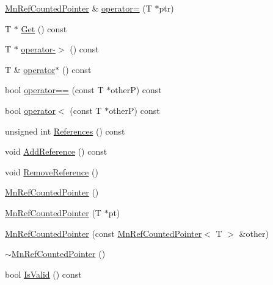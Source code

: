 \begin{DoxyCompactItemize}
\item 
\mbox{\hyperlink{classROOT_1_1Minuit2_1_1MnRefCountedPointer}{Mn\+Ref\+Counted\+Pointer}} \& \mbox{\hyperlink{classROOT_1_1Minuit2_1_1MnRefCountedPointer_a6867125c7f9d76199e7a6676eed5f682}{operator=}} (T $\ast$ptr)
\item 
T $\ast$ \mbox{\hyperlink{classROOT_1_1Minuit2_1_1MnRefCountedPointer_ae88bd272c286587bad6200c41c66909b}{Get}} () const
\item 
T $\ast$ \mbox{\hyperlink{classROOT_1_1Minuit2_1_1MnRefCountedPointer_a9fa09cb52e1c503eb82c3359932eef34}{operator-\/$>$}} () const
\item 
T \& \mbox{\hyperlink{classROOT_1_1Minuit2_1_1MnRefCountedPointer_ab926bb95d092c87afef79bb6c1776bd4}{operator$\ast$}} () const
\item 
bool \mbox{\hyperlink{classROOT_1_1Minuit2_1_1MnRefCountedPointer_a2dbec0c22ef3492abc24cdaa885fd26e}{operator==}} (const T $\ast$otherP) const
\item 
bool \mbox{\hyperlink{classROOT_1_1Minuit2_1_1MnRefCountedPointer_a5927f1f650da34bb024a31e18119ed1e}{operator$<$}} (const T $\ast$otherP) const
\item 
unsigned int \mbox{\hyperlink{classROOT_1_1Minuit2_1_1MnRefCountedPointer_acffac58848d817d7747631954daf3e0c}{References}} () const
\item 
void \mbox{\hyperlink{classROOT_1_1Minuit2_1_1MnRefCountedPointer_a9a8d01a9009e9a9b272c14e46cbeb4d5}{Add\+Reference}} () const
\item 
void \mbox{\hyperlink{classROOT_1_1Minuit2_1_1MnRefCountedPointer_a8e348ffb51b9ed7793cce28e6330309f}{Remove\+Reference}} ()
\item 
\mbox{\hyperlink{classROOT_1_1Minuit2_1_1MnRefCountedPointer_ab597b297b8bc186cf67a2c6874c2d169}{Mn\+Ref\+Counted\+Pointer}} ()
\item 
\mbox{\hyperlink{classROOT_1_1Minuit2_1_1MnRefCountedPointer_a854656023f22c0c856c12047a0a7c0e0}{Mn\+Ref\+Counted\+Pointer}} (T $\ast$pt)
\item 
\mbox{\hyperlink{classROOT_1_1Minuit2_1_1MnRefCountedPointer_aec0e2c9c47a86046d393bfb63399db7d}{Mn\+Ref\+Counted\+Pointer}} (const \mbox{\hyperlink{classROOT_1_1Minuit2_1_1MnRefCountedPointer}{Mn\+Ref\+Counted\+Pointer}}$<$ T $>$ \&other)
\item 
\mbox{\hyperlink{classROOT_1_1Minuit2_1_1MnRefCountedPointer_ae3bdd5d92c9c44bd3490954bca60fd47}{$\sim$\+Mn\+Ref\+Counted\+Pointer}} ()
\item 
bool \mbox{\hyperlink{classROOT_1_1Minuit2_1_1MnRefCountedPointer_a29a80f5f0dce4b10f42b04b3b3cb264c}{Is\+Valid}} () const

\end{DoxyCompactItemize}
